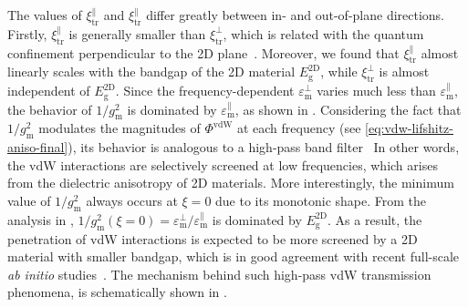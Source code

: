 The values of $\xi_{\mathrm{tr}}^{\parallel}$ and
$\xi_{\mathrm{tr}}^{\parallel}$ differ greatly between in- and
out-of-plane directions.
%
Firstly, \(\xi_{\mathrm{tr}}^{\parallel}\) is generally smaller than
\(\xi_{\mathrm{tr}}^{\perp}\), which is related with the quantum
confinement perpendicular to the 2D
plane~\cite{Matthes_2016_effective_PRB}.
%
Moreover, we found that $\xi_{\mathrm{tr}}^{\parallel}$ almost
linearly scales with the bandgap of the 2D material
$E_{\mathrm{g}}^{\mathrm{2D}}$, while $\xi_{\mathrm{tr}}^{\perp}$ is
almost independent of $E_{\mathrm{g}}^{\mathrm{2D}}$. 
%
Since the frequency-dependent $\varepsilon_{\mathrm{m}}^{\perp}$ varies
much less than $\varepsilon_{\mathrm{m}}^{\parallel}$, the behavior of
\(1/g_{\mathrm{m}}^{2}\) is dominated by
$\varepsilon_{\mathrm{m}}^{\parallel}$, as shown in
.
%
Considering the fact that $1/g_{\mathrm{m}}^{2}$ modulates the
magnitudes of $\Phi^{\mathrm{vdW}}$ at each frequency (see
\autoref{eq:vdw-lifshitz-aniso-final}), its behavior is analogous to a
high-pass band filter~ 
%
In other words, the vdW interactions are selectively screened at low
frequencies, which arises from the dielectric anisotropy of 2D
materials.
%
More interestingly, the minimum value of $1/g_{\mathrm{m}}^{2}$ always
occurs at $\xi = 0$ due to its monotonic shape.
%
From the analysis in ,
$1/g_{\mathrm{m}}^{2}(\xi=0)=\varepsilon_{\mathrm{m}}^{\perp} /
\varepsilon_{\mathrm{m}}^{\parallel}$ is dominated by
$E_{\mathrm{g}}^{\mathrm{2D}}$.
%
As a result, the penetration of vdW interactions is expected to be
more screened by a 2D material with smaller bandgap, which is in good
agreement with recent full-scale \textit{ab initio}
studies~\cite{Liu_2018_gr}.
%
The mechanism behind such high-pass vdW transmission phenomena, is
schematically shown in .

